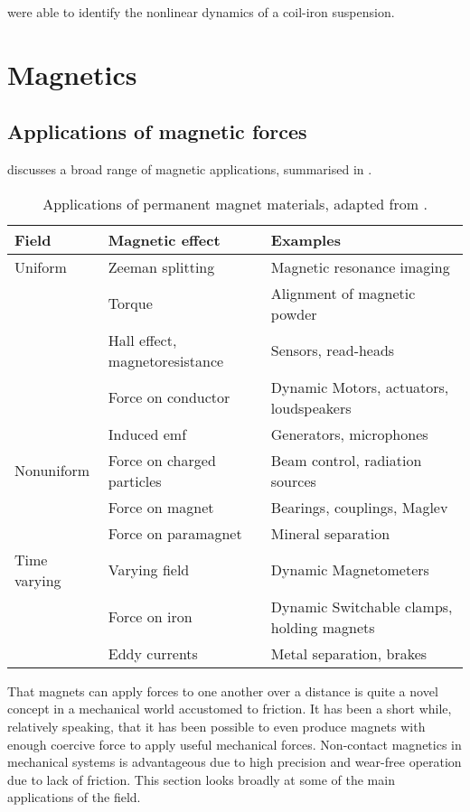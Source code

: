 \textcite{agamennoni2004} were able to identify the nonlinear dynamics
of a coil-iron suspension.

\section{Magnetics}

\subsection{Applications of magnetic forces}

\textcite{coey2002} discusses a broad range of magnetic applications,
summarised in .

\begin{table}
\begin{wide}
\begin{tabular}{@{}lll@{}}
\toprule
Field & Magnetic effect & Examples \\
\midrule
Uniform & Zeeman splitting & Magnetic resonance imaging \\
& Torque & Alignment of magnetic powder \\
& Hall effect, magnetoresistance & Sensors, read-heads \\
& Force on conductor & Dynamic Motors, actuators, loudspeakers \\
& Induced emf & Generators, microphones \\
Nonuniform & Force on charged particles & Beam control, 
radiation sources %
\\
& Force on magnet & Bearings, couplings, Maglev \\
& Force on paramagnet & Mineral separation \\
Time varying & Varying field & Dynamic Magnetometers \\
& Force on iron & Dynamic Switchable clamps, holding magnets \\
& Eddy currents & Metal separation, brakes \\
\bottomrule
\end{tabular}
\end{wide}
\caption{Applications of permanent magnet materials, 
adapted from \textcite{coey2002}.}
\end{table}

That magnets can apply forces to one another over a distance is quite a novel
concept in a mechanical world accustomed to friction. It has been a short
while, relatively speaking, that it has been possible to even produce
magnets with enough coercive force to apply useful mechanical forces.
Non-contact magnetics in mechanical systems is advantageous due to high
precision and wear-free operation due to lack of friction. This section looks
broadly at some of the main applications of the field.

